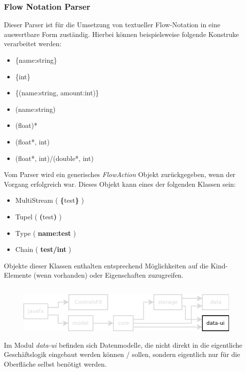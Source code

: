 \subsubsection{Flow Notation Parser}
Dieser Parser ist für die Umsetzung von textueller Flow-Notation in eine auswertbare Form zuständig. Hierbei können
beispielsweise folgende Konstruke verarbeitet werden:

\begin{itemize}
	\item \{name:string\}
	\item \{int\}
	\item \{(name:string, amount:int)\}
	\item (name:string)
	\item (float)*
	\item (float*, int)
	\item (float*, int)/(double*, int)
\end{itemize}
Vom Parser wird ein generisches \textit{FlowAction} Objekt zurückgegeben, wenn der Vorgang erfolgreich war. Dieses
Objekt kann eines der folgenden Klassen sein:

\begin{itemize}
	\item MultiStream ( \textbf{\{}test\textbf{\}} )
	\item Tupel ( \textbf{(}test\textbf{)} )
	\item Type ( \textbf{name:test} )
	\item Chain ( \textbf{test/int} )
\end{itemize}
Objekte dieser Klassen enthalten entsprechend Möglichkeiten auf die Kind-Elemente (wenn vorhanden) oder
Eigenschaften zuzugreifen.
\subsection{\textModDataUI}
\label{\textModDataUI}
\begin{figure}[h!]
	\centering
	\includegraphics[width=.8\textwidth]{module_dependencies_data-ui.png}
\end{figure}

Im Modul \textit{data-ui} befinden sich Datenmodelle, die nicht direkt in die eigentliche Geschäftslogik
eingebaut werden können / sollen, sondern eigentlich nur für die Oberfläche selbst benötigt werden.

